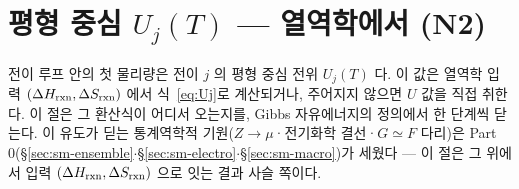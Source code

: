 \section{평형 중심 $U_j(T)$ --- 열역학에서 (N2)}\label{sec:center}
전이 루프 안의 첫 물리량은 전이 $j$ 의 평형 중심 전위 $U_j(T)$ 다. 이 값은 열역학 입력 $(\Delta H_{\mathrm{rxn}},\Delta S_{\mathrm{rxn}})$
에서 식~\eqref{eq:Uj}로 계산되거나, 주어지지 않으면 $U$ 값을 직접 취한다. 이 절은 그 환산식이 어디서 오는지를, Gibbs
자유에너지의 정의에서 한 단계씩 닫는다. 이 유도가 딛는 통계역학적 기원($Z\to\mu$·전기화학 결선·$G\simeq F$ 다리)은
Part 0(\S\ref{sec:sm-ensemble}$\cdot$\S\ref{sec:sm-electro}$\cdot$\S\ref{sec:sm-macro})가 세웠다 --- 이 절은 그 위에서 입력
$(\Delta H_{\mathrm{rxn}},\Delta S_{\mathrm{rxn}})$ 으로 잇는 결과 사슬 쪽이다.

